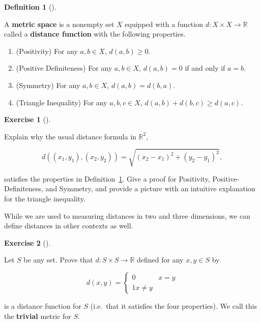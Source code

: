 \documentclass[
  letterpaper,
  DIV=11,
  numbers=noendperiod]{scrreprt}
\providecommand{\tightlist}{%
  \setlength{\itemsep}{0pt}\setlength{\parskip}{0pt}}
\def\R{\mathbb R}
\theoremstyle{plain}
\theoremstyle{definition}
\newtheorem{exercise}{Exercise}[chapter]
\theoremstyle{plain}
\theoremstyle{plain}
\theoremstyle{definition}
\theoremstyle{definition}
\newtheorem{definition}{Definition}[chapter]
\theoremstyle{remark}
\begin{document}
\begin{definition}[]\protect\hypertarget{def-metric-space}{}\label{def-metric-space}

A \textbf{metric space} is a nonempty set \(X\) equipped with a function
\(d:X\times X\rightarrow\R\) called a \textbf{distance function} with
the following properties.

\begin{enumerate}
\def\labelenumi{\arabic{enumi}.}
\tightlist
\item
  (Positivity) For any \(a,b\in X\), \(d(a,b)\geq 0\).
\item
  (Positive Definiteness) For any \(a,b\in X\), \(d(a,b)=0\) if and only
  if \(a=b\).
\item
  (Symmetry) For any \(a,b\in X\), \(d(a,b)=d(b,a)\).
\item
  (Triangle Inequality) For any \(a,b,c\in X\),
  \(d(a,b)+d(b,c)\geq d(a,c)\).
\end{enumerate}

\end{definition}

\begin{exercise}[]\protect\hypertarget{exr-distance-in-r2}{}\label{exr-distance-in-r2}

Explain why the usual distance formula in \(\R^2\),

\[d((x_1,y_1),(x_2,y_2))=\sqrt{(x_2-x_1)^2+(y_2-y_1)^2},\]

satisfies the properties in Definition~\ref{def-metric-space}. Give a
proof for Positivity, Positive-Definiteness, and Symmetry, and provide a
picture with an intuitive explanation for the triangle inequality.

\end{exercise}

While we are used to measuring distances in two and three dimensions, we
can define distances in other contexts as well.

\begin{exercise}[]\protect\hypertarget{exr-trivial-metric}{}\label{exr-trivial-metric}

Let \(S\) be any set. Prove that \(d:S\times S\rightarrow\R\) defined
for any \(x,y\in S\) by

\[d(x,y)=\begin{cases} 0 & x=y \\ 1 x\neq y \end{cases}\]

is a distance function for \(S\) (i.e.~that it satisfies the four
properties). We call this the \textbf{trivial} metric for \(S\).

\end{exercise}
\end{document}
